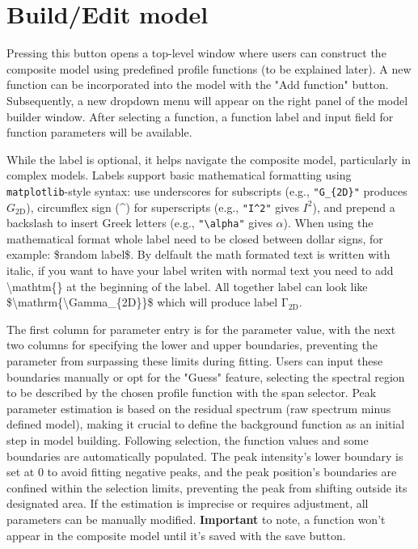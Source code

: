 \section{Build/Edit model}
Pressing this button opens a top-level window where users can construct the composite model using predefined profile functions (to be explained later). A new function can be incorporated into the model with the "Add function" button. Subsequently, a new dropdown menu will appear on the right panel of the model builder window. After selecting a function, a function label and input field for function parameters will be available. 
\par
While the label is optional, it helps navigate the composite model, particularly in complex models. Labels support basic mathematical formatting using \texttt{matplotlib}-style syntax: use underscores for subscripts (e.g., \texttt{"G\_\{2D\}"} produces $G_\mathrm{2D}$), circumflex sign (\textasciicircum) for superscripts (e.g., \texttt{"I\textasciicircum 2"} gives $I^2$), and prepend a backslash to insert Greek letters (e.g., \texttt{"\textbackslash alpha"} gives $\alpha$). When using the mathematical format whole label need to be closed between dollar signs, for example: \$random label\$. By delfault the math formated text is written with italic, if you want to have your label writen with normal text you need to add \textbackslash mathtm\{\} at the beginning of the label. All together label can look like \$\textbackslash mathrm\{\textbackslash Gamma\_\{2D\}\}\$ which will produce label $\mathrm{\Gamma_{2D}}$.
\par
The first column for parameter entry is for the parameter value, with the next two columns for specifying the lower and upper boundaries, preventing the parameter from surpassing these limits during fitting. Users can input these boundaries manually or opt for the "Guess" feature, selecting the spectral region to be described by the chosen profile function with the span selector. Peak parameter estimation is based on the residual spectrum (raw spectrum minus defined model), making it crucial to define the background function as an initial step in model building. Following selection, the function values and some boundaries are automatically populated. The peak intensity's lower boundary is set at 0 to avoid fitting negative peaks, and the peak position's boundaries are confined within the selection limits, preventing the peak from shifting outside its designated area. If the estimation is imprecise or requires adjustment, all parameters can be manually modified. \textbf{Important} to note, a function won't appear in the composite model until it's saved with the save button. 
